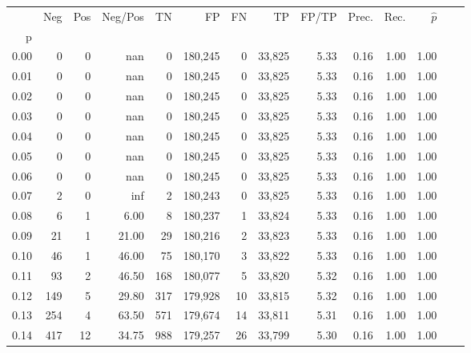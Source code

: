 \begin{tabular}{rrrrrrrrrrrrrr}
\toprule
{} &    Neg &  Pos & Neg/Pos &       TN &       FP &      FN &      TP & FP/TP & Prec. &  Rec. & $\hat{p}$ \\
p    &        &      &         &          &          &         &         &       &       &       &           \\
\midrule
0.00 &      0 &    0 &     nan &        0 &  180,245 &       0 &  33,825 &  5.33 &  0.16 &  1.00 &      1.00 \\
0.01 &      0 &    0 &     nan &        0 &  180,245 &       0 &  33,825 &  5.33 &  0.16 &  1.00 &      1.00 \\
0.02 &      0 &    0 &     nan &        0 &  180,245 &       0 &  33,825 &  5.33 &  0.16 &  1.00 &      1.00 \\
0.03 &      0 &    0 &     nan &        0 &  180,245 &       0 &  33,825 &  5.33 &  0.16 &  1.00 &      1.00 \\
0.04 &      0 &    0 &     nan &        0 &  180,245 &       0 &  33,825 &  5.33 &  0.16 &  1.00 &      1.00 \\
0.05 &      0 &    0 &     nan &        0 &  180,245 &       0 &  33,825 &  5.33 &  0.16 &  1.00 &      1.00 \\
0.06 &      0 &    0 &     nan &        0 &  180,245 &       0 &  33,825 &  5.33 &  0.16 &  1.00 &      1.00 \\
0.07 &      2 &    0 &     inf &        2 &  180,243 &       0 &  33,825 &  5.33 &  0.16 &  1.00 &      1.00 \\
0.08 &      6 &    1 &    6.00 &        8 &  180,237 &       1 &  33,824 &  5.33 &  0.16 &  1.00 &      1.00 \\
0.09 &     21 &    1 &   21.00 &       29 &  180,216 &       2 &  33,823 &  5.33 &  0.16 &  1.00 &      1.00 \\
0.10 &     46 &    1 &   46.00 &       75 &  180,170 &       3 &  33,822 &  5.33 &  0.16 &  1.00 &      1.00 \\
0.11 &     93 &    2 &   46.50 &      168 &  180,077 &       5 &  33,820 &  5.32 &  0.16 &  1.00 &      1.00 \\
0.12 &    149 &    5 &   29.80 &      317 &  179,928 &      10 &  33,815 &  5.32 &  0.16 &  1.00 &      1.00 \\
0.13 &    254 &    4 &   63.50 &      571 &  179,674 &      14 &  33,811 &  5.31 &  0.16 &  1.00 &      1.00 \\
0.14 &    417 &   12 &   34.75 &      988 &  179,257 &      26 &  33,799 &  5.30 &  0.16 &  1.00 &      1.00 \\

\end{tabular}
